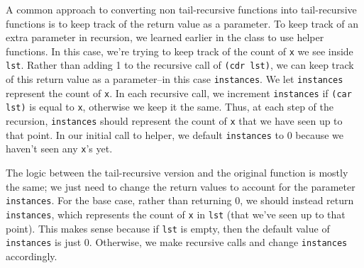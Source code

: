 \begin{blocksection}
\begin{solution}
A common approach to converting non tail-recursive functions into 
tail-recursive functions is to keep track of the return value as a 
parameter.
To keep track of an extra parameter in recursion, we learned earlier 
in the class to use helper functions. In this case, we're trying to 
keep track of the count of \lstinline{x} we see inside \lstinline{lst}. Rather than adding 1 
to the recursive call of \lstinline{(cdr lst)}, we can keep track of this return 
value as a parameter--in this case \lstinline{instances}. We let \lstinline{instances} 
represent the count of \lstinline{x}. In each recursive call, we increment 
\lstinline{instances} if \lstinline{(car lst)} is equal to \lstinline{x}, otherwise we keep it the same. 
Thus, at each step of the recursion, \lstinline{instances} should represent the 
count of \lstinline{x} that we have seen up to that point. In our initial call 
to helper, we default \lstinline{instances} to 0 because we haven't seen any \lstinline{x}'s 
yet.

The logic between the tail-recursive version and the original 
function is mostly the same; we just need to change the return 
values to account for the parameter \lstinline{instances}. For the base case, 
rather than returning 0, we should instead return \lstinline{instances}, which 
represents the count of \lstinline{x} in \lstinline{lst} (that we've seen up to that point). 
This makes sense because if \lstinline{lst} is empty, then the default value of 
\lstinline{instances} is just 0. Otherwise, we make recursive calls and change 
\lstinline{instances} accordingly.

\end{solution}

\end{blocksection}
